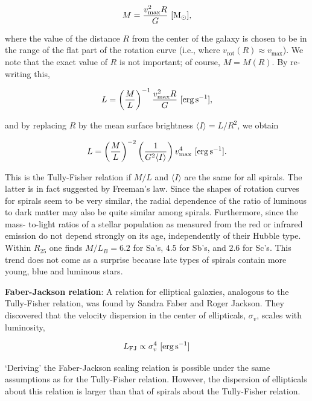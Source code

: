 \documentclass[a4paper,10pt]{article}
\begin{document}
\begin{align*}
    M = \frac{v_\mathrm{max}^2R}{G} ~ [{\rm M_\odot}],
\end{align*}

{\noindent}where the value of the distance $R$ from the center of the galaxy is chosen to be in the range of the flat part of the rotation curve (i.e., where $v_\mathrm{rot}(R)\approx v_\mathrm{max}$). We note that the exact value of $R$ is not important; of course, $M=M(R)$. By re-writing this,

\begin{align*}
    L = \left(\frac{M}{L}\right)^{-1} \frac{v_\mathrm{max}^2R}{G} ~ [{\rm erg\,s^{-1}}],
\end{align*}

{\noindent}and by replacing $R$ by the mean surface brightness $\langle I\rangle=L/R^2$, we obtain

\begin{align*}
    L = \left(\frac{M}{L}\right)^{-2} \left(\frac{1}{G^2\langle I\rangle}\right)v_\mathrm{max}^4 ~ [{\rm erg\,s^{-1}}].
\end{align*}

{\noindent}This is the Tully-Fisher relation if $M/L$ and $\langle I\rangle$ are the same for all spirals. The latter is in fact suggested by Freeman’s law. Since the shapes of rotation curves for spirals seem to be very similar, the radial dependence of the ratio of luminous to dark matter may also be quite similar among spirals. Furthermore, since the mass- to-light ratios of a stellar population as measured from the red or infrared emission do not depend strongly on its age, independently of their Hubble type. Within $R_{25}$ one finds $M/L_B=6.2$ for Sa's, $4.5$ for Sb's, and $2.6$ for Sc's. This trend does not come as a surprise because late types of spirals contain more young, blue and luminous stars.

{\noindent}\textbf{Faber-Jackson relation}: A relation for elliptical galaxies, analogous to the Tully-Fisher relation, was found by Sandra Faber and Roger Jackson. They discovered that the velocity dispersion in the center of ellipticals, $\sigma_v$, scales with luminosity,

\begin{align*}
    L_\mathrm{FJ} \propto \sigma_v^4 ~ [{\rm erg\,s^{-1}}]
\end{align*}

{\noindent}`Deriving' the Faber-Jackson scaling relation is possible under the same assumptions as for the Tully-Fisher relation. However, the dispersion of ellipticals about this relation is larger than that of spirals about the Tully-Fisher relation.
\end{document}
